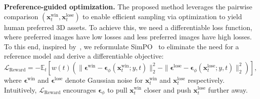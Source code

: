 \textbf{Preference-guided optimization.} 
The proposed method leverages the pairwise comparison
$(\mathbf{x}_t^{\text{win}},\mathbf{x}_t^{\text{lose}})$ to enable efficient sampling via optimization to yield human preferred 3D assets.
To achieve this, we need a differentiable loss function, where preferred images have low losses and less preferred images have high losses. To this end, inspired by~\citep{rafailov2024direct,meng2024simpo,wallace2024diffusion}, we reformulate SimPO~\citep{meng2024simpo} to eliminate the need for a reference model and derive a differentiable objective:
\begin{equation}
    \mathcal{L}_{\text{Reward}} = -\mathbb{E}_{t} \left[w(t)\left(  \| \bm{\epsilon}^\text{win} - \bm{\epsilon}_\phi(\mathbf{x}_t^\text{win};y,t) \|_2^2 
    - \| \bm{\epsilon}^\text{lose} - \bm{\epsilon}_\phi(\mathbf{x}_t^\text{lose};y,t) \|_2^2 \right) \right],
\end{equation}
where $\bm{\epsilon}^\text{win}$ and $\bm{\epsilon}^\text{lose}$ denote Gaussian noise for $\mathbf{x}_t^\text{win}$ and $\mathbf{x}_t^\text{lose}$ respectively. 
Intuitively, $\mathcal{L}_{\text{Reward}}$ encourages $\bm{\epsilon}_\phi$ to pull $\mathbf{x}_t^\text{win}$ closer and push $\mathbf{x}_t^\text{lose}$ further away.

